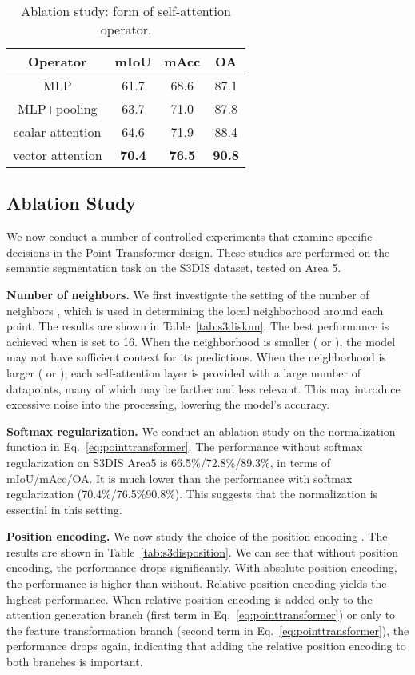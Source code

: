 \documentclass[final]{cvpr}
\newcommand\mypara[1]{\vspace{1mm}\noindent\textbf{#1}}
\begin{document}
\begin{table}
	\centering
	\begin{tabular}{ c | c c c }
		\toprule[1pt]
		Operator & mIoU & mAcc & OA \\
		\hline
		MLP & 61.7 & 68.6 & 87.1 \\
		MLP+pooling & 63.7 & 71.0 & 87.8 \\
		\hline
		scalar attention & 64.6 & 71.9 & 88.4 \\
		vector attention & \textbf{70.4} & \textbf{76.5} & \textbf{90.8} \\
		\bottomrule[1pt]
	\end{tabular}
	\caption{Ablation study: form of self-attention operator.}
	\label{tab:s3disattention}
\end{table}

\subsection{Ablation Study}
\label{sec:ablation}

We now conduct a number of controlled experiments that examine specific decisions in the Point Transformer design. These studies are performed on the semantic segmentation task on the S3DIS dataset, tested on Area 5.

\mypara{Number of neighbors.}
We first investigate the setting of the number of neighbors , which is used in determining the local neighborhood around each point. The results are shown in Table~\ref{tab:s3disknn}. The best performance is achieved when  is set to 16. When the neighborhood is smaller ( or ), the model may not have sufficient context for its predictions. When the neighborhood is larger ( or ), each self-attention layer is provided with a large number of datapoints, many of which may be farther and less relevant. This may introduce excessive noise into the processing, lowering the model's accuracy.

\mypara{Softmax regularization.}
We conduct an ablation study on the normalization function  in Eq.~\ref{eq:pointtransformer}. The performance without softmax regularization on S3DIS Area5 is 66.5\%/72.8\%/89.3\%, in terms of mIoU/mAcc/OA. It is much lower than the performance with softmax regularization (70.4\%/76.5\%90.8\%). This suggests that the normalization is essential in this setting.

\mypara{Position encoding.}
We now study the choice of the position encoding . The results are shown in Table~\ref{tab:s3disposition}. We can see that without position encoding, the performance drops significantly. With absolute position encoding, the performance is higher than without. Relative position encoding yields the highest performance. When relative position encoding is added only to the attention generation branch (first term in Eq.~\ref{eq:pointtransformer}) or only to the feature transformation branch (second term in Eq.~\ref{eq:pointtransformer}), the performance drops again, indicating that adding the relative position encoding to both branches is important.
\end{document}
